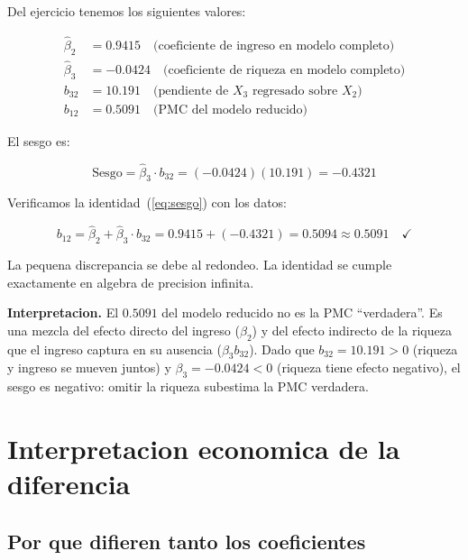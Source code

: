 \documentclass[12pt, letterpaper]{article}
\theoremstyle{remark}
\begin{document}
Del ejercicio tenemos los siguientes valores:

\begin{align}
  \hat\beta_2 &= 0.9415 \quad \text{(coeficiente de ingreso en modelo completo)}
  \label{eq:valores1}\\
  \hat\beta_3 &= -0.0424 \quad \text{(coeficiente de riqueza en modelo completo)}
  \label{eq:valores2}\\
  b_{32}      &= 10.191 \quad \text{(pendiente de } X_3 \text{ regresado sobre } X_2\text{)}
  \label{eq:valores3}\\
  b_{12}      &= 0.5091 \quad \text{(PMC del modelo reducido)}
  \label{eq:valores4}
\end{align}

El sesgo es:

\begin{equation}
  \text{Sesgo} = \hat\beta_3 \cdot b_{32} = (-0.0424)(10.191) = -0.4321
  \label{eq:sesgo_numerico}
\end{equation}

\noindent Verificamos la identidad~(\ref{eq:sesgo}) con los datos:

\begin{equation}
  b_{12} = \hat\beta_2 + \hat\beta_3 \cdot b_{32}
         = 0.9415 + (-0.4321)
         = 0.5094
         \approx 0.5091 \quad \checkmark
  \label{eq:verificacion}
\end{equation}

\noindent La pequena discrepancia se debe al redondeo. La identidad se cumple
exactamente en algebra de precision infinita.

\begin{clave}
  \textbf{Interpretacion.} El $0.5091$ del modelo reducido no es la PMC
  ``verdadera''. Es una mezcla del efecto directo del ingreso ($\beta_2$) y
  del efecto indirecto de la riqueza que el ingreso captura en su ausencia
  ($\beta_3 b_{32}$). Dado que $b_{32} = 10.191 > 0$ (riqueza y ingreso se
  mueven juntos) y $\beta_3 = -0.0424 < 0$ (riqueza tiene efecto negativo),
  el sesgo es negativo: omitir la riqueza subestima la PMC verdadera.
\end{clave}

\section{Interpretacion economica de la diferencia}

\subsection{Por que difieren tanto los coeficientes}
\end{document}
